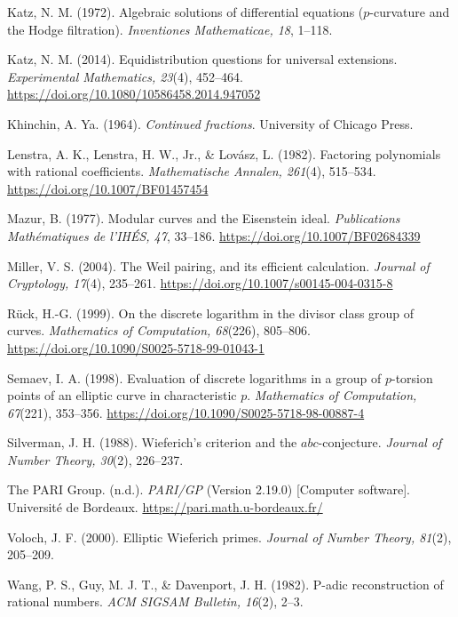 \documentclass[11pt,a4paper]{article}
\numberwithin{equation}{section}
\theoremstyle{plain}
\theoremstyle{definition}
\begin{document}
Katz, N. M. (1972). Algebraic solutions of differential equations ($p$-curvature and the Hodge filtration). \emph{Inventiones Mathematicae, 18}, 1--118.

Katz, N. M. (2014). Equidistribution questions for universal extensions. \emph{Experimental Mathematics, 23}(4), 452--464. \url{https://doi.org/10.1080/10586458.2014.947052}

Khinchin, A. Ya. (1964). \emph{Continued fractions}. University of Chicago Press.

Lenstra, A. K., Lenstra, H. W., Jr., \& Lov\'asz, L. (1982). Factoring polynomials with rational coefficients. \emph{Mathematische Annalen, 261}(4), 515--534. \url{https://doi.org/10.1007/BF01457454}

Mazur, B. (1977). Modular curves and the Eisenstein ideal. \emph{Publications Math\'ematiques de l'IH\'ES, 47}, 33--186. \url{https://doi.org/10.1007/BF02684339}

Miller, V. S. (2004). The Weil pairing, and its efficient calculation. \emph{Journal of Cryptology, 17}(4), 235--261. \url{https://doi.org/10.1007/s00145-004-0315-8}

R\"uck, H.-G. (1999). On the discrete logarithm in the divisor class group of curves. \emph{Mathematics of Computation, 68}(226), 805--806. \url{https://doi.org/10.1090/S0025-5718-99-01043-1}

Semaev, I. A. (1998). Evaluation of discrete logarithms in a group of $p$-torsion points of an elliptic curve in characteristic $p$. \emph{Mathematics of Computation, 67}(221), 353--356. \url{https://doi.org/10.1090/S0025-5718-98-00887-4}

Silverman, J. H. (1988). Wieferich's criterion and the $abc$-conjecture. \emph{Journal of Number Theory, 30}(2), 226--237.

The PARI Group. (n.d.). \emph{PARI/GP} (Version 2.19.0) [Computer software]. Universit\'e de Bordeaux. \url{https://pari.math.u-bordeaux.fr/}

Voloch, J. F. (2000). Elliptic Wieferich primes. \emph{Journal of Number Theory, 81}(2), 205--209.

Wang, P. S., Guy, M. J. T., \& Davenport, J. H. (1982). P-adic reconstruction of rational numbers. \emph{ACM SIGSAM Bulletin, 16}(2), 2--3.

\endgroup
\end{document}
